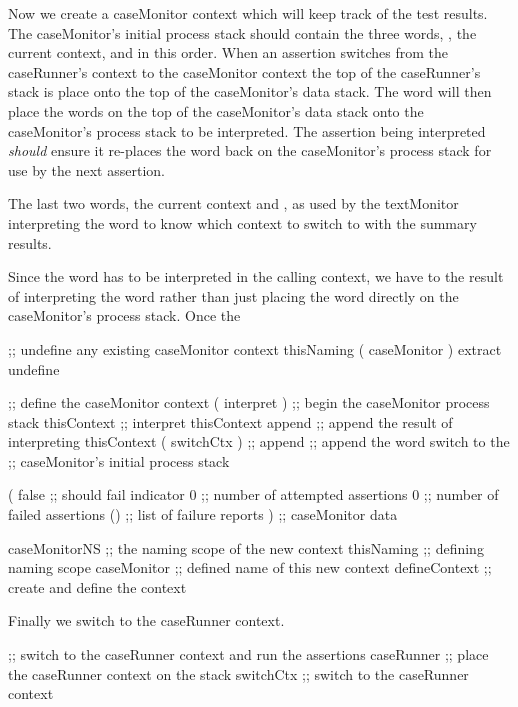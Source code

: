 Now we create a caseMonitor context which will keep track of the test 
results. The caseMonitor's initial process stack should contain the three 
words, , the current context, and  in this 
order. When an assertion switches from the caseRunner's context to the 
caseMonitor context the top of the caseRunner's stack is place onto the 
top of the caseMonitor's data stack. The  word will then 
place the words on the top of the caseMonitor's data stack onto the 
caseMonitor's process stack to be interpreted. The assertion being 
interpreted \emph{should} ensure it re-places the  word 
back on the caseMonitor's process stack for use by the next assertion. 

The last two words, the current context and , as used by the 
textMonitor interpreting the  word to know which context to 
switch to with the summary results. 

Since the  word has to be interpreted in the calling 
context, we have to  the result of interpreting the 
 word rather than just placing the  
word directly on the caseMonitor's process stack. Once the 

\startJoylolCode
  ;; undefine any existing caseMonitor context
  thisNaming
  ( caseMonitor ) extract
  undefine

  ;; define the caseMonitor context
  ( interpret ) ;; begin the caseMonitor process stack
  thisContext   ;; interpret thisContext 
  append        ;; append the result of interpreting thisContext
  ( switchCtx ) ;; 
  append        ;; append the word switch to the
                ;; caseMonitor's initial process stack
  
  ( 
    false       ;; should fail indicator
    0           ;; number of attempted assertions
    0           ;; number of failed assertions
    ()          ;; list of failure reports
  )             ;; caseMonitor data

  caseMonitorNS ;; the naming scope of the new context
  thisNaming    ;; defining naming scope
  caseMonitor   ;; defined name of this new context
  defineContext ;; create and define the context
\stopJoylolCode

Finally we switch to the caseRunner context.

\startJoylolCode
  ;; switch to the caseRunner context and run the assertions
  caseRunner ;; place the caseRunner context on the stack
  switchCtx  ;; switch to the caseRunner context
  

